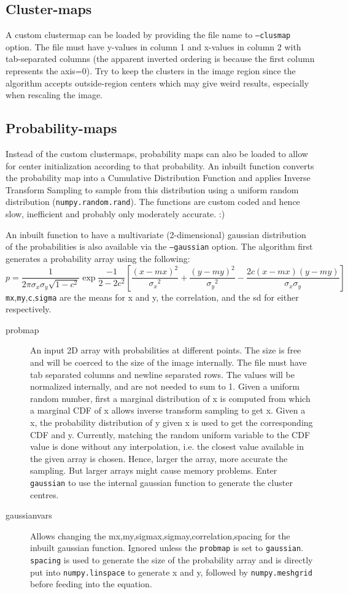 \documentclass[15pt]{article}
\begin{document}
\subsection{Cluster-maps}
A custom clustermap can be loaded by providing the file name to \texttt{--clusmap} option. The file must have y-values in column 1 and x-values in column 2 with tab-separated columns (the apparent inverted ordering is because the first column represents the axis=0). Try to keep the clusters in the image region since the algorithm accepts outside-region centers which may give weird results, especially when rescaling the image.
\subsection{Probability-maps}
Instead of the custom clustermaps, probability maps can also be loaded to allow for center initialization according to that probability. An inbuilt function converts the probability map into a Cumulative Distribution Function and applies Inverse Transform Sampling to sample from this distribution using a uniform random distribution (\texttt{numpy.random.rand}). The functions are custom coded and hence slow, inefficient and probably only moderately accurate. :)

An inbuilt function to have a multivariate (2-dimensional) gaussian distribution of the probabilities is also available via the \texttt{--gaussian} option. The algorithm first generates a probability array using the following:
$$p = \frac{1}{2\pi \sigma_x\sigma_y\sqrt{1-c^2}}\exp{\frac{-1}{2-2c^2}\left[\frac{(x-mx)^2}{{\sigma_x}^2}+\frac{(y-my)^2}{{\sigma_y}^2}-\frac{2c(x-mx)(y-my)}{\sigma_x\sigma_y}\right]}$$
\texttt{mx},\texttt{my},\texttt{c},\texttt{sigma} are the means for x and y, the correlation, and the sd for either respectively.
\begin{description}
\item [probmap] An input 2D array with probabilities at different points. The size is free and will be coerced to the size of the image internally. The file must have tab separated columns and newline separated rows. The values will be normalized internally, and are not needed to sum to 1. Given a uniform random number, first a marginal distribution of x is computed from which a marginal CDF of x allows inverse transform sampling to get x. Given a x, the probability distribution of y given x is used to get the corresponding CDF and y. Currently, matching the random uniform variable to the CDF value is done without any interpolation, i.e. the closest value available in the given array is chosen. Hence, larger the array, more accurate the sampling. But larger arrays might cause memory problems. Enter \texttt{gaussian} to use the internal gaussian function to generate the cluster centres.
\item [gaussianvars] Allows changing the mx,my,sigmax,sigmay,correlation,spacing for the inbuilt gaussian function. Ignored unless the \texttt{probmap} is set to \texttt{gaussian}. \texttt{spacing} is used to generate the size of the probability array and is directly put into \texttt{numpy.linspace} to generate x and y, followed by \texttt{numpy.meshgrid} before feeding into the equation.
\end{description}
\end{document}
